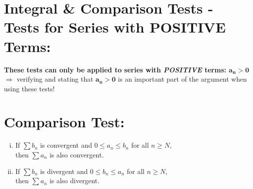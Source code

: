 
\setlength{\columnseprule}{.4pt}
\setlength{\columnsep}{3em}

\section*{Integral \& Comparison Tests - Tests for Series with POSITIVE Terms: }
\textbf{These tests can only be applied to series with \textit{POSITIVE} terms: \(\boldsymbol{a_n >0}\)}\\
\(\Rightarrow\)  verifying and stating that \(\boldsymbol{a_n >0}\) is an important part of the argument when using these tests!\\
\vspace*{.1in}



\section*{Comparison Test:}
\begin{enumerate}[(i)]
\item If \(\sum b_n\) is convergent and \(0\leq a_n \leq b_n\) for all \(n\geq N\),\\ then \(\sum a_n\) is also convergent.
\item If \(\sum b_n\) is divergent and \(0\leq b_n \leq a_n\) for all \(n\geq N\),\\ then \(\sum a_n\) is also divergent.
\end{enumerate}


